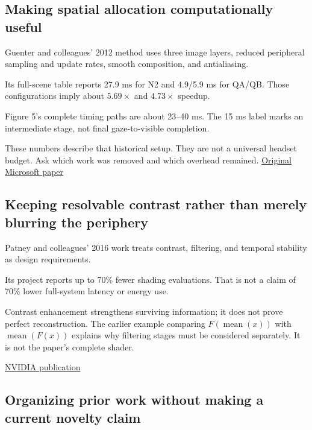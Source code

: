 \subsection{Making spatial allocation computationally useful}\label{04-visual-computing-ii-ch043-making-spatial-allocation-computationally-useful}

Guenter and colleagues' 2012 method uses three image layers, reduced peripheral sampling and update rates, smooth composition, and antialiasing.

Its full-scene table reports 27.9 ms for N2 and 4.9/5.9 ms for QA/QB. Those configurations imply about \(5.69\times\) and \(4.73\times\) speedup.

Figure 5's complete timing paths are about 23--40 ms. The 15 ms label marks an intermediate stage, not final gaze-to-visible completion.

These numbers describe that historical setup. They are not a universal headset budget. Ask which work was removed and which overhead remained. \href{https://www.microsoft.com/en-us/research/wp-content/uploads/2012/11/foveated_final15.pdf}{Original Microsoft paper}

\subsection{Keeping resolvable contrast rather than merely blurring the periphery}\label{04-visual-computing-ii-ch043-keeping-resolvable-contrast-rather-than-merely-blurring-the-periphery}

Patney and colleagues' 2016 work treats contrast, filtering, and temporal stability as design requirements.

Its project reports up to 70\% fewer shading evaluations. That is not a claim of 70\% lower full-system latency or energy use.

Contrast enhancement strengthens surviving information; it does not prove perfect reconstruction. The earlier example comparing \(F(\operatorname{mean}(x))\) with \(\operatorname{mean}(F(x))\) explains why filtering stages must be considered separately. It is not the paper's complete shader.

\href{https://research.nvidia.com/publication/2016-12_towards-foveated-rendering-gaze-tracked-virtual-reality}{NVIDIA publication}

\subsection{Organizing prior work without making a current novelty claim}\label{04-visual-computing-ii-ch043-organizing-prior-work-without-making-a-current-novelty-claim}

